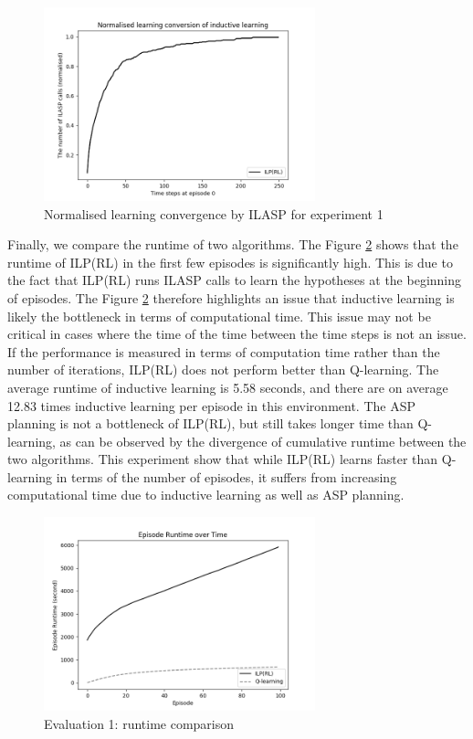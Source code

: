 \begin{figure}[!htb]
\centering
\includegraphics[width=0.7\textwidth]{./figures/experiment1_ilasp}
\caption{Normalised learning convergence by ILASP for experiment 1}
\label{experiment1_ilasp}
\end{figure}

Finally, we compare the runtime of two algorithms. 
The Figure \ref{exp1_runtime} shows that the runtime of ILP(RL) in the first few episodes is significantly high. 
This is due to the fact that ILP(RL) runs ILASP calls to learn the hypotheses at the beginning of episodes.
The Figure \ref{exp1_runtime} therefore highlights an issue that inductive learning is likely the bottleneck in terms of computational time.
This issue may not be critical in cases where the time of the time between the time steps is not an issue. If the performance is measured in terms of computation time rather than the number of iterations, 
ILP(RL) does not perform better than Q-learning. 
The average runtime of inductive learning is 5.58 seconds, and there are on average 12.83 times inductive learning per episode in this environment.
The ASP planning is not a bottleneck of ILP(RL), but still takes longer time than Q-learning, as can be observed by the divergence of cumulative runtime between the two algorithms. 
This experiment show that while ILP(RL) learns faster than Q-learning in terms of the number of episodes, it suffers from increasing computational time due to inductive learning as well as ASP planning.

\begin{figure}[!htb]
\centering
\includegraphics[width=0.7\textwidth]{./figures/experiment1_runtime}
\caption{Evaluation 1: runtime comparison}
\label{exp1_runtime}
\end{figure}

